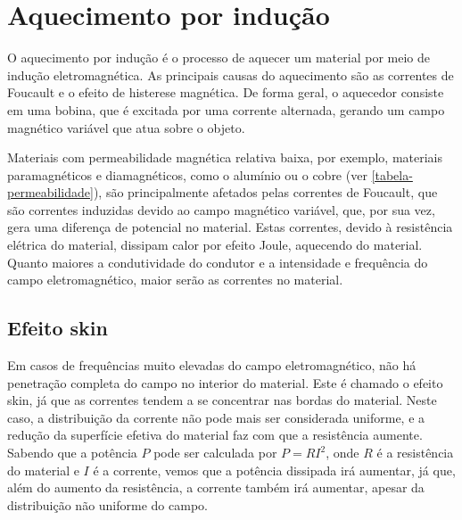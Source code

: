 \chapter{Aquecimento por indução}
O aquecimento por indução\cite{wiki-induction} é o processo de aquecer um material por meio de indução eletromagnética. As principais causas do aquecimento são as correntes de Foucault e o efeito de histerese magnética. De forma geral, o aquecedor consiste em uma bobina, que é excitada por uma corrente alternada, gerando um campo magnético variável que atua sobre o objeto.

Materiais com permeabilidade magnética relativa baixa, por exemplo, materiais paramagnéticos e diamagnéticos, como o alumínio ou o cobre (ver \autoref{tabela-permeabilidade}), são principalmente afetados pelas correntes de Foucault, que são correntes induzidas devido ao campo magnético variável, que, por sua vez, gera uma diferença de potencial no material. Estas correntes, devido à resistência elétrica do material, dissipam calor por efeito Joule, aquecendo do material. Quanto maiores a condutividade do condutor e a intensidade e frequência do campo eletromagnético, maior serão as correntes no material.

\begin{table}[h]
\end{table}

\section{Efeito skin}
Em casos de frequências muito elevadas do campo eletromagnético, não há penetração completa do campo no interior do material. Este é chamado o efeito skin, já que as correntes tendem a se concentrar nas bordas do material. Neste caso, a distribuição da corrente não pode mais ser considerada uniforme, e a redução da superfície efetiva do material faz com que a resistência aumente. Sabendo que a potência $P$ pode ser calculada por $P = RI^2$, onde $R$ é a resistência do material e $I$ é a corrente, vemos que a potência dissipada irá aumentar, já que, além do aumento da resistência, a corrente também irá aumentar, apesar da distribuição não uniforme do campo.
